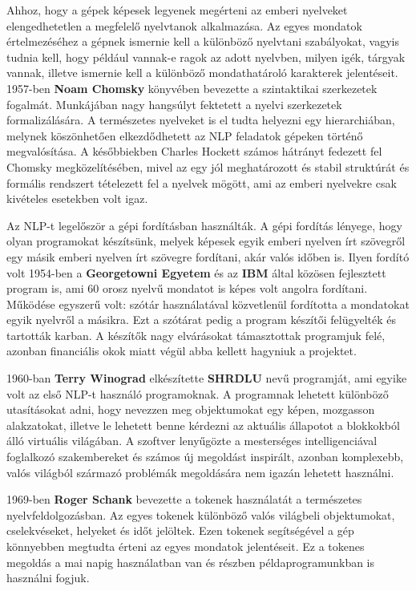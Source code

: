 Ahhoz, hogy a gépek képesek legyenek megérteni az emberi nyelveket elengedhetetlen a megfelelő nyelvtanok alkalmazása. Az egyes mondatok értelmezéséhez a gépnek ismernie kell a különböző nyelvtani szabályokat, vagyis tudnia kell, hogy például vannak-e ragok az adott nyelvben, milyen igék, tárgyak vannak, illetve ismernie kell a különböző mondathatároló karakterek jelentéseit. 1957-ben \textbf{Noam Chomsky} könyvében\cite{chomsky} bevezette a szintaktikai szerkezetek fogalmát. Munkájában nagy hangsúlyt fektetett a nyelvi szerkezetek formalizálására. A természetes nyelveket is el tudta helyezni egy hierarchiában, melynek köszönhetően elkezdődhetett az NLP feladatok gépeken történő megvalósítása. A későbbiekben Charles Hockett számos hátrányt fedezett fel Chomsky megközelítésében, mivel az egy jól meghatározott és stabil struktúrát és formális rendszert tételezett fel a nyelvek mögött, ami az emberi nyelvekre csak kivételes esetekben volt igaz.

Az NLP-t legelőször a gépi fordításban használták. A gépi fordítás lényege, hogy olyan programokat készítsünk, melyek képesek egyik emberi nyelven írt szövegről egy másik emberi nyelven írt szövegre fordítani, akár valós időben is. Ilyen fordító volt 1954-ben a \textbf{Georgetowni Egyetem} és az \textbf{IBM} által közösen fejlesztett program\cite{ibm_trans} is, ami 60 orosz nyelvű mondatot is képes volt angolra fordítani. Működése egyszerű volt: szótár használatával közvetlenül fordította a mondatokat egyik nyelvről a másikra. Ezt a szótárat pedig a program készítői felügyelték és tartották karban. A készítők nagy elvárásokat támasztottak programjuk felé, azonban financiális okok miatt végül abba kellett hagyniuk a projektet.\cite{history}

1960-ban \textbf{Terry Winograd} elkészítette \textbf{SHRDLU} nevű programját\cite{history}, ami egyike volt az első NLP-t használó programoknak. A programnak lehetett különböző utasításokat adni, hogy nevezzen meg objektumokat egy képen, mozgasson alakzatokat, illetve le lehetett benne kérdezni az aktuális állapotot a blokkokból álló virtuális világában. A szoftver lenyűgözte a mesterséges intelligenciával foglalkozó szakembereket és számos új megoldást inspirált, azonban komplexebb, valós világból származó problémák megoldására nem igazán lehetett használni.

1969-ben \textbf{Roger Schank} bevezette a tokenek használatát a természetes nyelvfeldolgozásban.\cite{history} Az egyes tokenek különböző valós világbeli objektumokat, cselekvéseket, helyeket és időt jelöltek. Ezen tokenek segítségével a gép könnyebben megtudta érteni az egyes mondatok jelentéseit. Ez a tokenes megoldás a mai napig használatban van és részben példaprogramunkban is használni fogjuk.

